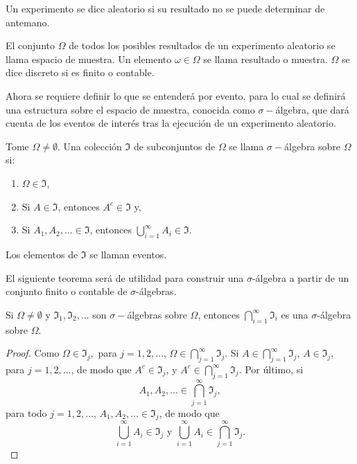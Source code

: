 \begin{defi}
		Un experimento se dice aleatorio si su resultado no se puede determinar de antemano.
	\end{defi}
\begin{defi}
		El conjunto $\Omega$ de todos los posibles resultados de un experimento aleatorio se llama espacio de muestra. Un elemento $\omega\in\Omega$ se llama resultado o muestra. $\Omega$ se dice discreto si es finito o contable.
	\end{defi}	
	Ahora se requiere definir lo que se entenderá por evento, para lo cual se definirá una estructura sobre el espacio de muestra, conocida como $\sigma-$álgebra, que dará cuenta de los eventos de interés tras la ejecución de un experimento aleatorio. 
	\begin{defi}
		Tome $\Omega\neq\emptyset$. Una colección $\Im$ de subconjuntos de $\Omega$ se llama $\sigma-$álgebra sobre $\Omega$ si:
		\begin{enumerate}
			\item $\Omega\in\Im$,
			\item Si $A\in\Im$, entonces $A^c\in\Im$ y,
			\item Si $A_1,A_2,\dots\in\Im$, entonces $\bigcup_{i=1}^\infty A_i\in\Im$.
		\end{enumerate}
		Los elementos de $\Im$ se llaman eventos.
	\end{defi}
	El siguiente teorema será de utilidad para construir una $\sigma$-álgebra a partir de un conjunto finito o contable de $\sigma$-álgebras.
	\begin{theo}
		Si $\Omega\neq\emptyset$ y $\Im_1,\Im_2,\dots$ son $\sigma-$álgebras sobre $\Omega$, entonces $\bigcap_{i=1}^\infty \Im_i$ es una $\sigma$-álgebra sobre $\Omega$.
	\end{theo}		
	
	\begin{proof}
		Como $\Omega\in\Im_j,$ para $j=1,2,\dots$, $\Omega\in\bigcap_{j=1}^\infty \Im_j$. Si $A\in\bigcap_{j=1}^\infty\Im_j$, $A\in\Im_j$, para $j=1,2,\dots$, de modo que $A^c\in\Im_j$, y $A^c\in\bigcap_{j=1}^\infty\Im_j$. Por último, si 
		$$A_1,A_2,\dots\in\bigcap_{j=1}^\infty\Im_j,$$
		para todo $j=1,2,\dots$, $A_1,A_2,\dots\in\Im_j$, de modo que
		$$\bigcup_{i=1}^\infty A_i\in\Im_j\text{ y }\bigcup_{i=1}^\infty A_i\in\bigcap_{j=1}^\infty\Im_j.$$ 
	\end{proof}
	
